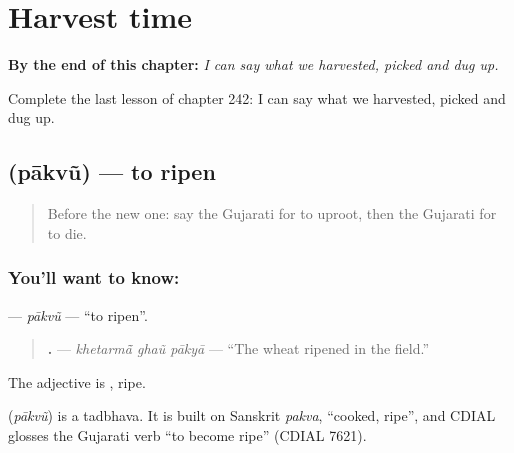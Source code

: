 
\chapter{Harvest time}
\label{ch:gu-harvest-time}

\begin{chapteropening}
\textbf{By the end of this chapter:} \emph{I can say what we harvested, picked and dug up.}

Complete the last lesson of chapter 242: I can say what we harvested, picked and dug up.
\end{chapteropening}

\section[\texorpdfstring{\gu{પાકવું} (pākvũ)}{પાકવું (pākvũ)}]{ (pākvũ) — to ripen}

\label{lesson:GU-C242-pakvu}



\begin{quote}
Before the new one: say the Gujarati for to uproot, then the Gujarati for to die.
\end{quote}

\subsection*{You'll want to know: }
\textbf{} — \emph{pākvũ} — \textquotedblleft{}to ripen\textquotedblright{}.

\begin{quote}
\textbf{  .} — \emph{khetarmā̃ ghaũ pākyā} — \textquotedblleft{}The wheat ripened in the field.\textquotedblright{}
\end{quote}

The adjective is \textbf{}, ripe.

\begin{cousinweb}
\textbf{} (\emph{pākvũ}) is a tadbhava. It is built on Sanskrit \emph{pakva}, \textquotedblleft{}cooked, ripe\textquotedblright{}, and CDIAL glosses the Gujarati verb \textquotedblleft{}to become ripe\textquotedblright{} (CDIAL 7621).
\end{cousinweb}

